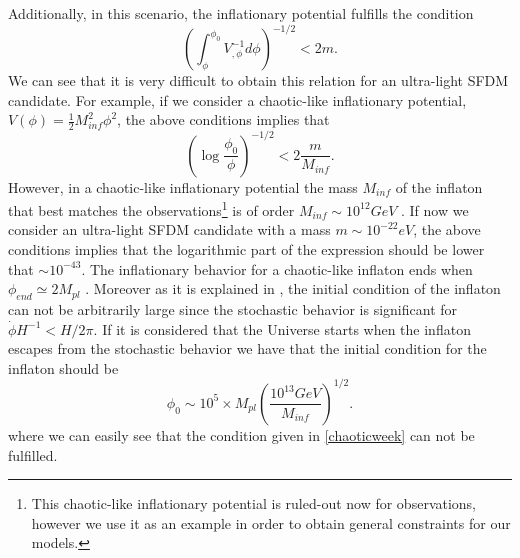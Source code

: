 \documentclass[amssymb,twocolumn,prd,nofootinbib,showpacs]{revtex4-1}
\begin{document}
Additionally, in this scenario, the inflationary potential fulfills the condition 
\begin{equation}
\left(\int^{\phi_0}_\phi V_{,\phi}^{-1}d\phi\right)^{-1/2}<2m.
\end{equation}
We can see that it is very difficult to obtain this relation for an ultra-light SFDM candidate. For example, if we consider a chaotic-like inflationary potential, $V(\phi)=\frac{1}{2}M_{inf}^2\phi^2$, the above conditions implies that
\begin{equation}\label{chaoticweek}
\left(\log\frac{\phi_0}{\phi}\right)^{-1/2}<2\frac{m}{M_{inf}}.
\end{equation}
However, in a chaotic-like inflationary potential the mass $M_{inf}$ of the inflaton that best matches the observations\footnote{This chaotic-like inflationary potential is ruled-out now for observations, however we use it as an example in order to obtain general constraints for our models.} is of order $M_{inf}\sim 10^{12} GeV$ \cite{Liddle}. If now we consider an ultra-light SFDM candidate with a mass $m\sim 10^{-22}eV$, the above conditions implies that the logarithmic part of the expression should be lower that $\sim 10^{-43}$. The inflationary behavior for a chaotic-like inflaton ends when $\phi_{end}\simeq 2M_{pl}$ \cite{curvatonatractor,Liddle}. Moreover as it is explained in \cite{curvatonatractor}, the initial condition of the inflaton can not be arbitrarily large since the stochastic behavior is significant for $\dot\phi H^{-1}<H/2\pi$. If it is considered that the Universe starts when the inflaton escapes from the stochastic behavior we have that the initial condition for the inflaton should be
\begin{equation}\label{phi_0}
\phi_0\sim 10^5\times M_{pl}\left(\frac{10^{13}GeV}{M_{inf}}\right)^{1/2}.
\end{equation}
where we can easily see that the condition given in \eqref{chaoticweek} can not be fulfilled.
\end{document}
